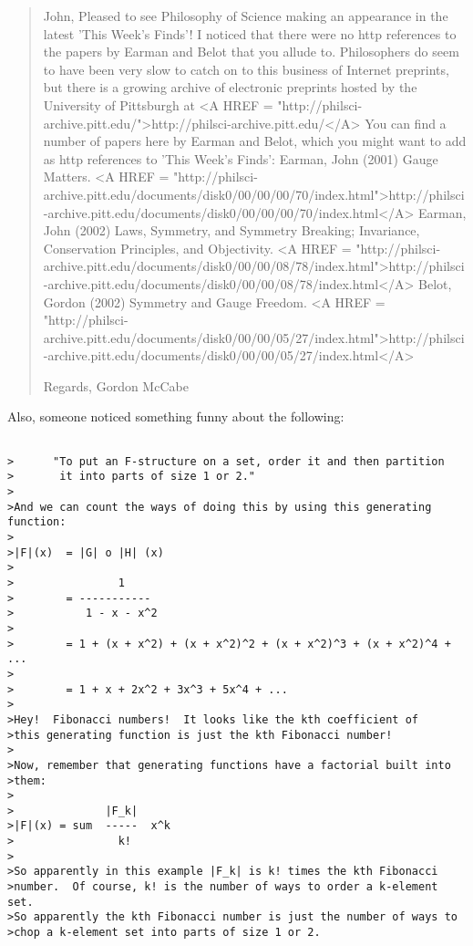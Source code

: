 \begin{quote}
John,
Pleased to see Philosophy of Science making an appearance in the latest
'This Week's Finds'!
I noticed that there were no http references to the papers by Earman and
Belot that you allude to. Philosophers do seem to have been very slow to
catch on to this business of Internet preprints, but there is a growing
archive of electronic preprints hosted by the University of Pittsburgh at
<A HREF = "http://philsci-archive.pitt.edu/">http://philsci-archive.pitt.edu/</A>
    You can find a number of papers here by
Earman and Belot, which you might want to add as http references to 'This
Week's Finds':
Earman, John (2001) Gauge Matters.
<A HREF = "http://philsci-archive.pitt.edu/documents/disk0/00/00/00/70/index.html">http://philsci-archive.pitt.edu/documents/disk0/00/00/00/70/index.html</A>
Earman, John (2002) Laws, Symmetry, and Symmetry Breaking; Invariance,
Conservation Principles, and Objectivity.
<A HREF = "http://philsci-archive.pitt.edu/documents/disk0/00/00/08/78/index.html">http://philsci-archive.pitt.edu/documents/disk0/00/00/08/78/index.html</A>
Belot, Gordon (2002) Symmetry and Gauge Freedom.
<A HREF = "http://philsci-archive.pitt.edu/documents/disk0/00/00/05/27/index.html">http://philsci-archive.pitt.edu/documents/disk0/00/00/05/27/index.html</A>

Regards,
Gordon McCabe
\end{quote}



Also, someone noticed something funny about the following: 

\begin{verbatim}

>      "To put an F-structure on a set, order it and then partition
>       it into parts of size 1 or 2."
>
>And we can count the ways of doing this by using this generating function:
>
>|F|(x)  = |G| o |H| (x)
>
>                1
>        = ----------- 
>           1 - x - x^2
>
>        = 1 + (x + x^2) + (x + x^2)^2 + (x + x^2)^3 + (x + x^2)^4 + ...
>
>        = 1 + x + 2x^2 + 3x^3 + 5x^4 + ...
>
>Hey!  Fibonacci numbers!  It looks like the kth coefficient of
>this generating function is just the kth Fibonacci number!
>
>Now, remember that generating functions have a factorial built into
>them:
>
>              |F_k|  
>|F|(x) = sum  -----  x^k
>                k!
>
>So apparently in this example |F_k| is k! times the kth Fibonacci
>number.  Of course, k! is the number of ways to order a k-element set.
>So apparently the kth Fibonacci number is just the number of ways to
>chop a k-element set into parts of size 1 or 2.  
\end{verbatim}
    

